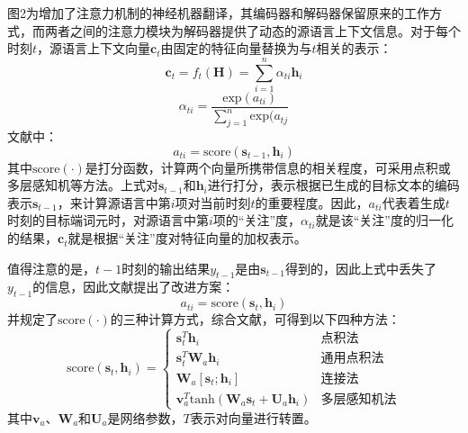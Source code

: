 图2为增加了注意力机制的神经机器翻译，其编码器和解码器保留原来的工作方式，而两者之间的注意力模块为解码器提供了动态的源语言上下文信息。对于每个时刻$t$，源语言上下文向量$\boldsymbol{c}_t$由固定的特征向量替换为与$t$相关的表示：
\begin{equation}
    \boldsymbol{c}_t = f_t(\boldsymbol{H})=\sum_{i=1}^{n}{\alpha}_{ti}\boldsymbol{h}_i
\end{equation}
\begin{equation}
    {\alpha}_{ti}=\frac{\mathrm{exp}(a_{ti})}{\sum_{j=1}^{n}\mathrm{exp}(a_{tj}}
\end{equation}
文献\cite{DBLP:journals/corr/BahdanauCB14}中：
\begin{equation}
    a_{ti} = \mathrm{score}(\boldsymbol{s}_{t-1},\boldsymbol{h}_i)
\end{equation}
其中$\mathrm{score}(\cdot)$是打分函数，计算两个向量所携带信息的相关程度，可采用点积或多层感知机等方法。上式对$\boldsymbol{s}_{t-1}$和$\boldsymbol{h}_i$进行打分，表示根据已生成的目标文本的编码表示$\boldsymbol{s}_{t-1}$，来计算源语言中第$i$项对当前时刻$t$的重要程度。因此，$a_{ti}$代表着生成$t$时刻的目标端词元时，对源语言中第$i$项的“关注”度，${\alpha}_{ti}$就是该“关注”度的归一化的结果，$\boldsymbol{c}_t$就是根据“关注”度对特征向量的加权表示。

值得注意的是，$t-1$时刻的输出结果$y_{t-1}$是由$\boldsymbol{s}_{t-1}$得到的，因此上式中丢失了$y_{t-1}$的信息，因此文献\cite{4_luong-etal-2015-effective}提出了改进方案：
\begin{equation}
    a_{ti} = \mathrm{score}(\boldsymbol{s}_{t},\boldsymbol{h}_i)
\end{equation}
并规定了$\mathrm{score}(\cdot)$的三种计算方式，综合文献\cite{3_DBLP:journals/corr/BahdanauCB14}，可得到以下四种方法：
\begin{equation}
    \mathrm{score}(\boldsymbol{s}_t, \boldsymbol{h}_i) = 
    \begin{cases}
        \boldsymbol{s}_t^T \boldsymbol{h}_i & \mathrm{点积法} \\
        \boldsymbol{s}_t^T \boldsymbol{W}_a \boldsymbol{h}_i & \mathrm{通用点积法} \\
        \boldsymbol{W}_a[\boldsymbol{s}_t; \boldsymbol{h}_i] & \mathrm{连接法} \\
        \boldsymbol{v}_a^T \mathrm{tanh}(\boldsymbol{W}_a \boldsymbol{s}_t+\boldsymbol{U}_a \boldsymbol{h}_i) & \mathrm{多层感知机法} 
    \end{cases}
\end{equation}
其中$\boldsymbol{v}_a$、$\boldsymbol{W}_a$和$\boldsymbol{U}_a$是网络参数，$T$表示对向量进行转置。

